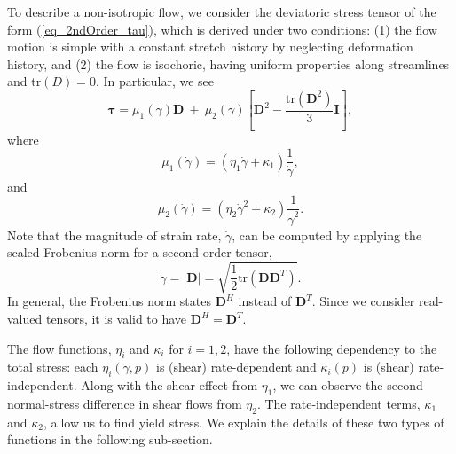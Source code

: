 To describe a non-isotropic flow, we consider the deviatoric stress tensor of the form (\ref{eq_2ndOrder_tau}), which is derived under two conditions:
(1) the flow motion is simple with a constant stretch history by neglecting deformation history, and (2) the flow is isochoric, having uniform properties along streamlines and tr$(D) = 0$. 
In particular, we see \cite{srivastava_viscometric_2021}
\begin{equation}
  {\bm {\bm \tau}}
  = \mu_1(\dot{\gamma}) {\bm D}
  \ +  \ 
 \mu_2 (\dot{\gamma})
  \left[ {\bm D}^2  - \frac{\text{tr}\left({\bm D}^2\right)}{3}{\bm I} \right],
\label{eq_2ndOrder_tau}
\end{equation}
where 
\begin{equation}
  \mu_1 (\dot{\gamma})
   = \left( \eta_1 \dot{\gamma}+ \kappa_1 \right) \frac{1}{\dot{\gamma}},
\label{eq_mu1_main}
\end{equation}
and 
\begin{equation}
  \mu_2 (\dot{\gamma}) = 
  \left( \eta_2  \dot{\gamma}^2
  +  \kappa_2 
  \right) \frac{1}{\dot{\gamma}^2}.
  \label{eq_mu2_main}
\end{equation}
Note that the magnitude of strain rate, $\dot{\gamma}$, can be computed by applying the scaled Frobenius norm for a second-order tensor, 
\[
  \dot{\gamma}  = |\bm{D}| = \sqrt{\frac{1}{2}
    \text{tr}\left(\bm{D} \bm{D}^{T} \right)}.
\]
In general, the Frobenius norm states $\bm{D}^H$ instead of $\bm{D}^T$. Since we consider real-valued tensors, it is valid to have $\bm{D}^H = \bm{D}^T$.
\par
The flow functions, $\eta_i$ and $\kappa_i$ for $i = 1,2$, have the following dependency to the total stress: each $\eta_i(\dot{\gamma}, p)$ is (shear) rate-dependent and $\kappa_i (p)$ is (shear) rate-independent. 
Along with the shear effect from $\eta_1$, we can observe the second normal-stress difference in shear flows from $\eta_2$.
The rate-independent terms, $\kappa_1$ and $\kappa_2$, allow us to find yield stress. 
We explain the details of these two types of functions in the following sub-section.

